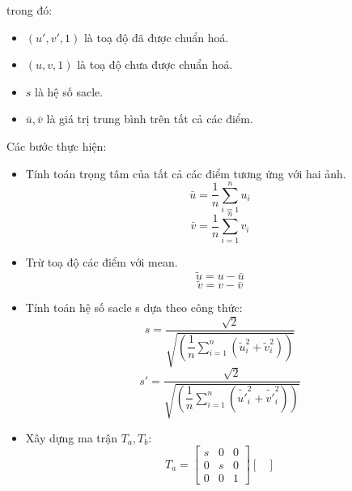 \documentclass[11pt]{article}
\begin{document}
trong đó:
\begin{itemize}
    \item $(u', v', 1)$ là toạ độ đã được chuẩn hoá.
    \item $(u, v, 1)$ là toạ độ chưa được chuẩn hoá.
    \item $s$ là hệ số sacle.
    \item $\bar{u}, \bar{v}$ là giá trị trung bình trên tất cả các điểm.
\end{itemize}

Các bước thực hiện:
\begin{itemize}
    \item Tính toán trọng tâm của tất cả các điểm tương ứng với hai ảnh.
        \begin{equation*}
            \bar{u} = \dfrac{1}{n} \displaystyle \sum_{i=1}^{n} u_i
        \end{equation*}
        \begin{equation*}
            \bar{v} = \dfrac{1}{n} \displaystyle \sum_{i=1}^{n} v_i
        \end{equation*}
    \item Trừ toạ độ các điểm với mean.
        \begin{equation*}
            \tilde{u} = u - \bar{u}
        \end{equation*}
        \begin{equation*}
            \tilde{v} = v - \bar{v}
        \end{equation*}
    \item  Tính toán hệ số sacle s dựa theo công thức:
        \begin{equation*}
            s = \dfrac{\sqrt{2}}{\sqrt{(\dfrac{1}{n}\displaystyle \sum_{i=1}^{n} (\tilde{u}_i^2 + \tilde{v}_i^2))}}
        \end{equation*}
        \begin{equation*}
            s' = \dfrac{\sqrt{2}}{\sqrt{(\dfrac{1}{n}\displaystyle \sum_{i=1}^{n} (\tilde{u'}_i^2 + \tilde{v'}_i^2))}}
        \end{equation*}
    \item Xây dựng ma trận $T_a, T_b$:
        \begin{equation*}
            T_a = 
            \begin{bmatrix}
                s & 0 & 0 \\
                0 & s & 0 \\
                0 & 0 & 1
            \end{bmatrix}
            \begin{bmatrix}

\end{bmatrix}
\end{equation*}
\end{itemize}
\end{document}
